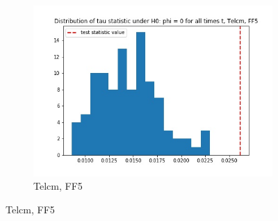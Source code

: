 \documentclass{article}
\begin{document}
\begin{figure}
\begin{subfigure}[b]{0.3\textwidth}
    \includegraphics[width=\textwidth]{Telcm/tau_hist_02_FF5.jpg}
    \caption{Telcm, FF5}
    \label{fig:2}
  \end{subfigure}
  \end{figure}

\newpage
\end{document}
